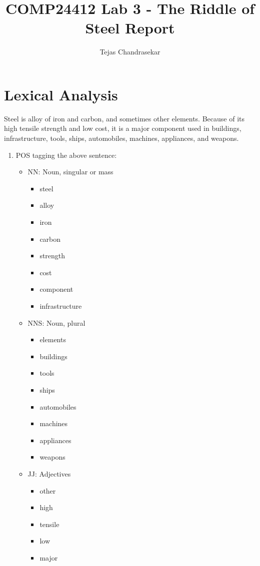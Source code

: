 \documentclass[12pt]{report}
\title{COMP24412 Lab 3 - The Riddle of Steel Report}
\author{Tejas Chandrasekar}
\begin{document}
\maketitle
\newpage

\section{Lexical Analysis}
Steel is alloy of iron and carbon, and sometimes other elements. Because of
its high tensile strength and low cost, it is a major component used in
buildings, infrastructure, tools, ships, automobiles, machines, appliances, and
weapons.\par
\begin{enumerate}
  \item POS tagging the above sentence:
  \begin{itemize}
    \item NN: Noun, singular or mass
    \begin{itemize}
      \item steel
      \item alloy
      \item iron
      \item carbon
      \item strength
      \item cost
      \item component
      \item infrastructure
    \end{itemize}
    \item NNS: Noun, plural
    \begin{itemize}
      \item elements
      \item buildings
      \item tools
      \item ships
      \item automobiles
      \item machines
      \item appliances
      \item weapons
    \end{itemize}
    \item JJ: Adjectives
    \begin{itemize}
      \item other
      \item high
      \item tensile
      \item low
      \item major

\end{itemize}
\end{itemize}
\end{enumerate}
\end{document}
